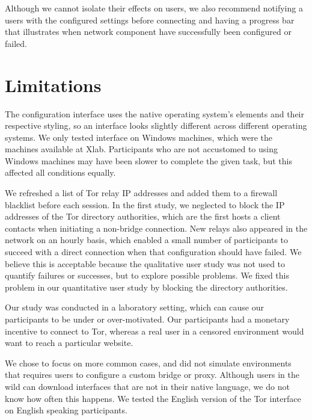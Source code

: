 \documentclass[USenglish,oneside,twocolumn]{article}
\begin{document}
Although we cannot isolate their effects on users, we also recommend notifying a users with the configured settings before connecting and having a progress bar that illustrates when network component have successfully been configured or failed.

\section{Limitations} 
The configuration interface uses the native operating system's elements and their respective styling, so an interface looks slightly different across different operating systems. We only tested interface on Windows machines, which were the machines available at Xlab. Participants who are not accustomed to using Windows machines may have been slower to complete the given task, but this affected all conditions equally. 

We refreshed a list of Tor relay IP addresses and added them
to a firewall blacklist before each session.
In the first study, we neglected to block the IP addresses
of the Tor directory authorities, which are the first hosts
a client contacts when initiating a non-bridge connection.
New relays also appeared in the network on an hourly basis,
which enabled a small number of participants to succeed with
a direct connection when that configuration should have failed.
We believe this is acceptable because 
the qualitative user study was not used to quantify failures or successes, 
but to explore possible problems.
We fixed this problem in our quantitative user study by blocking the directory authorities.


Our study was conducted in a laboratory setting, which can cause our participants to be under or over-motivated. Our participants had a monetary incentive to connect to Tor, whereas a real user in a censored environment would want to reach a particular website. 

We chose to focus on more common cases, and did not simulate environments that requires users to configure a custom bridge or proxy. Although users in the wild can download interfaces that are not in their native language, we do not know how often this happens. We tested the English version of the Tor interface on English speaking participants. 
\end{document}
